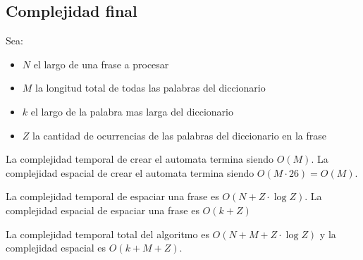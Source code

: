 \documentclass{article}
\begin{document}
\subsection*{Complejidad final}

Sea:
\begin{itemize}
    \item $N$ el largo de una frase a procesar
    \item $M$ la longitud total de todas las palabras del diccionario
    \item $k$ el largo de la palabra mas larga del diccionario
    \item $Z$ la cantidad de ocurrencias de las palabras del diccionario en la frase
\end{itemize}

La complejidad temporal de crear el automata termina siendo $O(M)$.
La complejidad espacial de crear el automata termina siendo $O(M \cdot 26) = O(M)$.

La complejidad temporal de espaciar una frase es $O(N+Z \cdot \log Z)$.
La complejidad espacial de espaciar una frase es $O(k+Z)$

La complejidad temporal total del algoritmo es $O(N+M+Z\cdot \log Z)$ y la complejidad espacial es
$O(k+M+Z)$.
\end{document}
